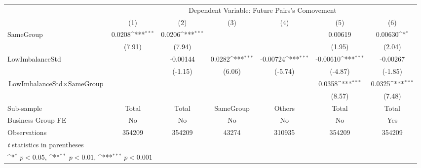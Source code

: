 {
\def\sym#1{\ifmmode^{#1}\else\(^{#1}\)\fi}
\begin{tabular}{l*{6}{c}}
\hline\hline
                    &\multicolumn{6}{c}{Dependent Variable:  Future Pairs's Comovement}                                                                 \\\cmidrule(lr){2-7}
                    &\multicolumn{1}{c}{(1)}         &\multicolumn{1}{c}{(2)}         &\multicolumn{1}{c}{(3)}         &\multicolumn{1}{c}{(4)}         &\multicolumn{1}{c}{(5)}         &\multicolumn{1}{c}{(6)}         \\
\hline
SameGroup           &      0.0208\sym{***}&      0.0206\sym{***}&                     &                     &     0.00619         &     0.00630\sym{*}  \\
                    &      (7.91)         &      (7.94)         &                     &                     &      (1.95)         &      (2.04)         \\
[1em]
LowImbalanceStd     &                     &    -0.00144         &      0.0282\sym{***}&    -0.00724\sym{***}&    -0.00610\sym{***}&    -0.00267         \\
                    &                     &     (-1.15)         &      (6.06)         &     (-5.74)         &     (-4.87)         &     (-1.85)         \\
[1em]
 $ \text{LowImbalanceStd} \times {\text{SameGroup} } $ &                     &                     &                     &                     &      0.0358\sym{***}&      0.0325\sym{***}\\
                    &                     &                     &                     &                     &      (8.57)         &      (7.48)         \\
\hline
Sub-sample          &       Total         &       Total         &   SameGroup         &      Others         &       Total         &       Total         \\
Business Group FE   &          No         &          No         &          No         &          No         &          No         &         Yes         \\
Observations        &      354209         &      354209         &       43274         &      310935         &      354209         &      354209         \\
\hline\hline
\multicolumn{7}{l}{\footnotesize \textit{t} statistics in parentheses}\\
\multicolumn{7}{l}{\footnotesize \sym{*} \(p<0.05\), \sym{**} \(p<0.01\), \sym{***} \(p<0.001\)}\\
\end{tabular}
}
